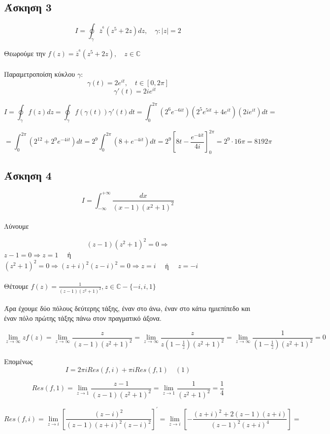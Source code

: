 \documentclass[12pt]{article}
\begin{document}
 \subsection{Άσκηση 3}

$$ I=\oint_{\gamma}\overline{z}^{^6}(z^5+2z)dz, \quad \gamma:|z|=2 $$

Θεωρούμε την $ f(z)=\overline{z}^{^6}(z^5+2z),\quad z\in\mathbb{C}$
\\ \\
Παραμετροποίση κύκλου $\gamma$:
$$ \gamma(t)=2e^{it},\quad t\in[0,2\pi] $$
$$ \qquad \gamma'(t)=2ie^{it}  $$

$$ Ι=\oint_{\gamma}f(z)dz=\oint_{\gamma}f(\gamma(t))\gamma'(t)dt= \int_{0}^{2\pi} (2^6e^{-6it})(2^5e^{5it}+4e^{it})(2ie^{it}) dt= $$

$$ =\int_{0}^{2\pi} (2^12 +2^9 e^{-4it}) dt = 2^9\int_{0}^{2\pi} (8 +  e^{-4it}) dt =  2^9 \left[ 8t - \frac { e^{-4it} }{4i} \right]_{0}^{2\pi}= 2^9\cdot 16\pi=8192\pi $$


\newpage



 \subsection{Άσκηση 4}
$$I= \int_{-\infty}^{+\infty} \frac{dx}{(x-1)(x^2+1)^2}$$
\\ Λύνουμε

$$ (z-1)(z^2+1)^2=0 \Rightarrow$$ 
$
z-1=0\Rightarrow z=1 \quad $ ή $ \quad$ 
\\
$ (z^2+1)^2=0\Rightarrow (z+i)^2(z-i)^2=0 \Rightarrow z=i \quad$ ή $ \quad z=-i$
\\
\\
Θέτουμε $ f(z)=\frac{1}{(z-1)(z^2+1)^2},z\in\mathbb{C}-\{-i,i,1\} $
\\ \\
Άρα έχουμε δύο πόλους δεύτερης τάξης, έναν στο άνω, έναν στο κάτω ημιεπίπεδο και έναν πόλο πρώτης τάξης πάνω στον πραγματικό άξονα.

$$ \lim_{z \to \infty } zf(z)=\lim_{z \to \infty } \frac{z}{(z-1)(z^2+1)^2}=
\lim_{z \to \infty } \frac{z}{z\left(1-\frac{1}{z}\right)(z^2+1)^2}=
\lim_{z \to \infty } \frac{1}{\left(1-\frac{1}{z}\right)(z^2+1)^2}=0$$

Επομένως $$ Ι= 2 \pi i Res(f,i)+ \pi i Res(f,1)\quad (1) $$

$$  Res(f,1)=\lim_{z\to 1}\frac{z-1}{(z-1)(z^2+1)^2}=\lim_{z\to 1}\frac{1}{(z^2+1)^2}=\frac{1}{4}$$

$$ Res(f,i)=\lim_{z\to i} \left[ \frac{(z-i)^2}{(z-1)(z+i)^2(z-i)^2} \right]^{'}= \lim_{z\to i} \left[-\frac{(z+i)^2+2(z-1)(z+i)}{(z-1)^2(z+i)^4}\right]=$$
\end{document}

